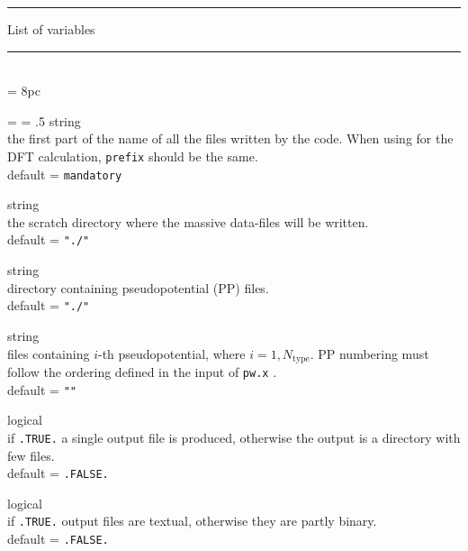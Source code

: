 %
%
\begin{centering}
\rule{2.5in}{0.01in} List of variables \rule{2.5in}{0.01in}
\end{centering}\\

\newdimen\descindent \descindent = 8pc
{\noindent \leftskip = \descindent \parskip = .5\baselineskip
{}%
{\sc string} \\ the first part of the name of all the files written by
the code. When using \PWSCF for the DFT calculation, {\tt prefix} should be the
same.\\ {\sc default} = {\tt mandatory} \par

\noindent{}%
{\sc string} \\ the scratch directory where the massive data-files will
be written.\\  {\sc default} = {\tt "./" }\par

\noindent{}%
{\sc string} \\directory containing pseudopotential (PP) files.\\
{\sc default} = {\tt "./"} \par

\noindent{}%
{\sc string} \\ files containing $i$-th pseudopotential, where $i=1, N_{\text{type}}$.
PP numbering must follow the ordering defined in the input of {\tt pw.x} . \\
{\sc default} =  {\tt ""} \par
\par

\noindent{}%
{\sc logical} \\ if {\tt .TRUE.} a single output file is produced, otherwise
  the output is a directory with few files.\\
{\sc default} = {\tt .FALSE. }\par

\noindent{}%
{\sc logical}  \\ if {\tt .TRUE.} output files are textual, otherwise
they are partly binary.\\
{\sc default} = {\tt .FALSE.} \par}\bigskip


